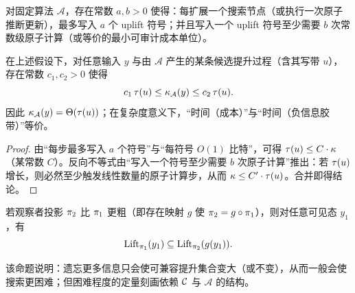 \begin{assumption}[有限观察者的读写耦合]
对固定算法 \(\mathcal A\)，存在常数 \(a,b>0\) 使得：每扩展一个搜索节点（或执行一次原子推断更新），最多写入 \(a\) 个 uplift 符号；并且写入一个 uplift 符号至少需要 \(b\) 次常数级原子计算（或等价的最小可审计成本单位）。
\end{assumption}

\begin{theorem}[观察者时间与负信息时间同阶等价]
在上述假设下，对任意输入 \(y\) 与由 \(\mathcal A\) 产生的某条候选提升过程（含其写带 \(u\)），存在常数 \(c_1,c_2>0\) 使得
\[
c_1\,\tau(u)\le \kappa_{\mathcal A}(y)\le c_2\,\tau(u).
\]
因此 \(\kappa_{\mathcal A}(y)=\Theta(\tau(u))\)；在复杂度意义下，“时间（成本）”与“时间（负信息胶带）”等价。
\end{theorem}

\begin{proof}
由“每步最多写入 \(a\) 个符号”与“每符号 \(O(1)\) 比特”，可得 \(\tau(u)\le C\cdot \kappa\)（某常数 \(C\)）。反向不等式由“写入一个符号至少需要 \(b\) 次原子计算”推出：若 \(\tau(u)\) 增长，则必然至少触发线性数量的原子计算步，从而 \(\kappa\le C'\cdot \tau(u)\)。合并即得结论。
\end{proof}

\begin{proposition}
若观察者投影 \(\pi_2\) 比 \(\pi_1\) 更粗（即存在映射 \(g\) 使 \(\pi_2=g\circ \pi_1\)），则对任意可见态 \(y_1\)，有
\[
\mathrm{Lift}_{\pi_1}(y_1)\subseteq \mathrm{Lift}_{\pi_2}(g(y_1)).
\]
\end{proposition}

\begin{remark}
该命题说明：遗忘更多信息只会使可兼容提升集合变大（或不变），从而一般会使搜索更困难；但困难程度的定量刻画依赖 \(\mathcal{C}\) 与 \(\mathcal A\) 的结构。
\end{remark}

